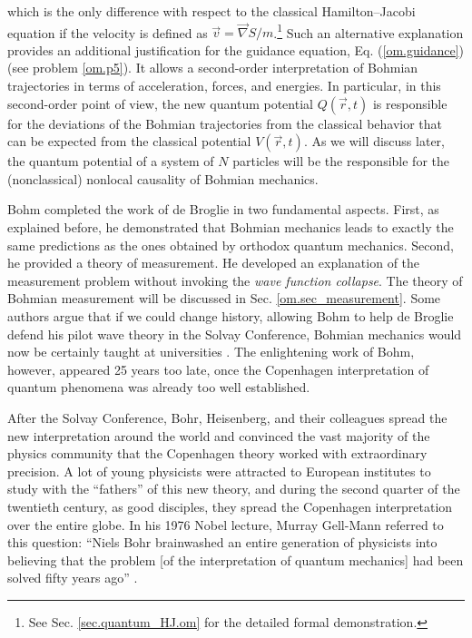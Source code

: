 \documentclass[nofootinbib, secnumarabic, amsmath, nobibnotes,11pt,aps,pra, floatfix]{revtex4-1}
\newcommand{\sref}[1]{Sec. \ref{#1}}
\newcommand{\eref}[1]{Eq. (\ref{#1})}
\begin{document}
which is the only difference with respect to the classical
Hamilton--Jacobi equation if the velocity is defined as $\vec{v} =
\vec{\nabla}S / m$.\footnote{See \sref{sec.quantum_HJ.om} for the
detailed formal demonstration.} Such an alternative explanation
provides an additional justification for the guidance equation,
\eref{om.guidance} (see problem \ref{om.p5}). It allows a
second-order interpretation of Bohmian trajectories in terms of
acceleration, forces, and energies. In particular, in this
second-order point of view, the new quantum potential $Q(\vec{r},t)$
is responsible for the deviations of the Bohmian trajectories from
the classical behavior that can be expected from the classical
potential $V(\vec{r},t)$. As we will discuss later, the quantum
potential of a system of $N$ particles will be the responsible for
the (nonclassical) nonlocal causality of Bohmian mechanics.

Bohm completed the work of de Broglie in two fundamental aspects. First, as explained before, he demonstrated that Bohmian mechanics leads to exactly the same predictions as the ones obtained by orthodox quantum mechanics. Second, he provided a theory of measurement. He developed an explanation of the measurement problem without invoking the \textit{wave function collapse}. The theory of Bohmian measurement will be discussed in \sref{om.sec_measurement}. Some authors argue that if we could change history, allowing Bohm to help de Broglie defend his pilot wave theory in the Solvay Conference, Bohmian mechanics would now be certainly taught at universities \cite{om.nikolic2008a}. The enlightening work of Bohm, however, appeared 25 years too late, once the Copenhagen interpretation of quantum phenomena was already too well established.

After the Solvay Conference, Bohr, Heisenberg, and their colleagues
spread the new interpretation around the world and convinced the
vast majority of the physics community that the Copenhagen theory worked with extraordinary precision. A lot of
young physicists were attracted to European institutes to study with
the ``fathers'' of this new theory, and during the second quarter of
the twentieth century, as good disciples, they spread the Copenhagen
interpretation over the entire globe. In his 1976 Nobel lecture,
Murray Gell-Mann referred to this question: ``Niels Bohr brainwashed
an entire generation of physicists into believing that the problem
[of the interpretation of quantum mechanics] had been solved fifty
years ago'' \cite{om.hard}.
\end{document}
